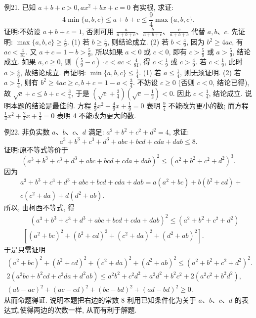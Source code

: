例21. 已知 $a+b+c>0, a x^2+b x+c=0$ 有实根, 求证:
$$
4 \min \{a, b, c\} \leqslant a+b+c \leqslant \frac{9}{4} \max \{a, b, c\} .
$$
证明:不妨设 $a+b+c=1$, 否则可用 $\frac{a}{a+b+c} 、 \frac{b}{a+b+c} 、 \frac{c}{a+b+c}$ 代替 $a, b 、 c$.
先证明: $\max \{a, b, c\} \geqslant \frac{4}{9}$.
(1) 若 $b \geqslant \frac{4}{9}$, 则结论成立.
(2) 若 $b<\frac{4}{9}$, 因为 $b^2 \geqslant 4 a c$, 有 $a c<\frac{4}{81}$.
又 $a+c=1-b>\frac{5}{9}$, 所以如果 $a<0$ 或 $c<0$, 即有 $c>\frac{5}{9}$ 或 $a>\frac{5}{9}$, 结论成立.
如果 $a, c \geqslant 0$, 则 $\left(\frac{5}{9}-c\right) \cdot c<a c<\frac{4}{81}$, 得 $c<\frac{1}{9}$ 或 $c>\frac{4}{9}$.
若 $c<\frac{1}{9}$, 此时 $a>\frac{4}{9}$, 故结论成立.
再证明: $\min \{a, b, c\} \leqslant \frac{1}{4}$.
(1) 若 $a \leqslant \frac{1}{4}$, 则无须证明.
(2) 若 $a>\frac{1}{4}$, 则有 $b^2 \geqslant 4 a c \geqslant c, b+c=1-a<\frac{3}{4}$.
不妨设 $c \geqslant 0$ (否则 $c<0$, 结论已得), 故 $\sqrt{c}+c \leqslant b+c<\frac{3}{4}$, 于是 $\left(\sqrt{c}+\frac{3}{4}\right)\left(\sqrt{c}-\frac{1}{2}\right)<0$.
因此 $c<\frac{1}{4}$, 结论成立.
说明本题的结论是最佳的.
方程 $\frac{4}{9} x^2+\frac{4}{9} x+\frac{1}{9}=0$ 表明 $\frac{9}{4}$ 不能改为更小的数; 而方程 $\frac{1}{4} x^2+ \frac{2}{4} x+\frac{1}{4}=0$ 表明 4 不能改为更大的数.



例22. 非负实数 $a 、 b 、 c 、 d$ 满足: $a^2+b^2+c^2+d^2=4$, 求证:
$$
a^3+b^3+c^3+d^3+a b c+b c d+c d a+d a b \leqslant 8 .
$$
证明:原不等式等价于
$$
\left(a^3+b^3+c^3+d^3+a b c+b c d+c d a+d a b\right)^2 \leqslant\left(a^2+b^2+c^2+d^2\right)^3 .
$$
因为
$$
\begin{aligned}
& a^3+b^3+c^3+d^3+a b c+b c d+c d a+d a b=a\left(a^2+b c\right)+b\left(b^2+c d\right)+ \\
& c\left(c^2+d a\right)+d\left(d^2+a b\right) .
\end{aligned}
$$
所以, 由柯西不等式, 得
$$
\begin{aligned}
& \quad\left(a^3+b^3+c^3+d^3+a b c+b c d+c d a+d a b\right)^2 \leqslant\left(a^2+b^2+c^2+d^2\right) \\
& {\left[\left(a^2+b c\right)^2+\left(b^2+c d\right)^2+\left(c^2+d a\right)^2+\left(d^2+a b\right)^2\right] .}
\end{aligned}
$$
于是只需证明
$$
\begin{gathered}
\left(a^2+b c\right)^2+\left(b^2+c d\right)^2+\left(c^2+d a\right)^2+\left(d^2+a b\right)^2 \leqslant\left(a^2+b^2+c^2+d^2\right)^2 . \\
2\left(a^2 b c+b^2 c d+c^2 d a+d^2 a b\right) \leqslant a^2 b^2+c^2 d^2+a^2 d^2+b^2 c^2+2\left(a^2 c^2+b^2 d^2\right), \\
(a b-a c)^2+(a c-c d)^2+(b c-b d)^2+(a d-b d)^2 \geqslant 0 .
\end{gathered}
$$
从而命题得证.
说明本题把右边的常数 8 利用已知条件化为关于 $a 、 b 、 c 、 d$ 的表达式,使得两边的次数一样, 从而有利于解题.



